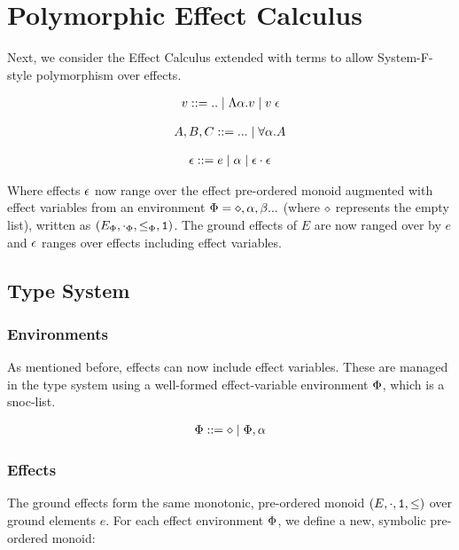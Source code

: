 \documentclass{Report}
\begin{document}
\section{Polymorphic Effect Calculus}


Next, we consider the Effect Calculus extended with terms to allow System-F-style polymorphism over effects.

\begin{align}
    v::=\text{..}\mid\elam{\a}{v}\mid\eapp{v}{\e}
\end{align}

\begin{align}
    A, B, C::=\text{...}\mid \all{\a}{A}
\end{align}

\begin{align}
    \e ::= e \mid \a \mid \e\dot\e
\end{align}

Where effects $\e$ now range over the effect pre-ordered monoid augmented with effect variables from an environment $\P = \nil, \a, \b ...$ (where $\nil$ represents the empty list), written as $(E_\P, \dotp, \subeffectp, \1)$. The ground effects of $E$ are now ranged over by $e$ and $\e$ ranges over effects including effect variables.




\subsection{Type System}
\subsubsection{Environments}
As mentioned before, effects can now include effect variables. These are managed in the type system using a well-formed effect-variable environment $\P$, which is a snoc-list.

\begin{align}
    \P ::= \nil \mid \P, \a
\end{align}



\subsubsection{Effects}
The ground effects form the same monotonic, pre-ordered monoid $(E, \dot, \1, \subeffect)$ over ground elements $e$. For each effect environment $\P$, we define a new, symbolic pre-ordered monoid:
\end{document}
